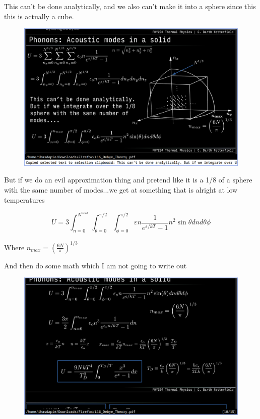 \documentclass[10pt]{article}
\begin{document}
This can't be done analytically, and we also can't make it into a sphere since this this is actually a cube.

\begin{figure}[H]
	\centering
	\includegraphics[width=0.8\linewidth]{img/294_hacky_integral.png}
\end{figure}

But if we do an evil approximation thing and pretend like it is a 1/8 of a sphere with the same number of modes...we get at something that is alright at low temperatures


\begin{equation}
	U = 3 
	\int^{N^{max}}_{n = 0}
	\int^{\pi /2}_{\theta = 0}
	\int^{\pi /2}_{\phi = 0}
	\varepsilon n \frac{1}{e^{\varepsilon /kT} - 1} n^2 \sin \theta dn d\theta \phi
\end{equation}

Where $ n_{max} = (\frac{6N}{\pi})^{1 /3} $ 


And then do some math which I am not going to write out

\begin{figure}[H]
	\centering
	\includegraphics[width=0.8\linewidth]{img/image_2022-04-08-12-56-34.png}
\end{figure}
\end{document}
